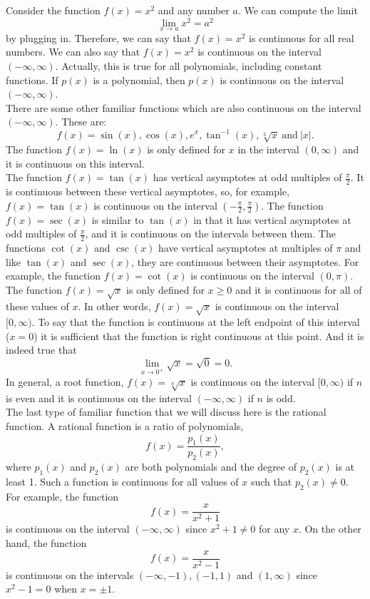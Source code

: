 \documentclass{ximera}
\begin{document}
Consider the function $f(x) = x^2$ and any number $a$. We can compute the limit 
\[\lim_{x \to a} x^2 = a^2\]
by plugging in. Therefore, we can say that $f(x) = x^2$ is continuous for all real numbers.
We can also say that $f(x) = x^2$ is continuous on the interval $(-\infty, \infty)$.
Actually, this is true for all polynomials, including constant functions.
If $p(x)$ is a polynomial, then $p(x)$ is continuous on the interval $(-\infty, \infty)$.\\
There are some other familiar functions which are also continuous on the interval $(-\infty, \infty)$.
These are: 
\[f(x) = \sin(x), \cos(x), e^x, \tan^{-1}(x), \sqrt[3] x \ \text{and} \ |x|.\]
The function $f(x) = \ln(x)$ is only defined for $x$ in the interval $(0, \infty)$ and it is 
continuous on this interval.\\
The function $f(x) = \tan(x)$ has vertical asymptotes at odd multiples of $\frac{\pi}{2}$. 
It is continuous between these vertical asymptotes, so, for example, $f(x) = \tan(x)$ is continuous on the 
interval $(-\frac{\pi}{2},\frac{\pi}{2})$.
The function $f(x) = \sec(x)$ is similar to $\tan(x)$ in that it has vertical asymptotes at odd 
multiples of $\frac{\pi}{2}$, and it is continuous on the intervals between them.
The functions $\cot(x)$ and $\csc(x)$ have vertical asymptotes at multiples of $\pi$ and like 
$\tan(x)$ and $\sec(x)$, they are continuous between their asymptotes. For example, the function
$f(x) = \cot(x)$ is continuous on the interval $(0, \pi)$.\\



The function $f(x) = \sqrt x$ is only defined for $x \geq 0$ and it is continuous for all of these values of $x$.
In other words, $f(x) = \sqrt x$ is continuous on the interval $[0, \infty)$. 
To say that the function is continuous at the left endpoint of this interval ($x = 0$) it is sufficient 
that the function is right continuous at this point. And it is indeed true that
\[\lim_{x \to 0^+} \sqrt x = \sqrt 0 = 0.\]
In general, a root function, $f(x) = \sqrt[n] x$ is continuous on the interval $[0, \infty)$ if $n$ is even and 
it is continuous on the interval $(-\infty, \infty)$ if $n$ is odd.\\

The last type of familiar function that we will discuss here is the rational function.  
A rational function is a ratio of polynomials, 
\[f(x) = \frac{p_1(x)}{p_2(x)}, \]
where $p_1(x)$ and $p_2(x)$ are both polynomials and the degree of $p_2(x)$ is at least 1.
Such a function is continuous for all values of $x$ such that $p_2(x) \neq 0$.
For example, the function
\[f(x) = \frac{x}{x^2 + 1}\]
is continuous on the interval $(-\infty, \infty)$ since $x^2 + 1 \neq 0$ for any $x$.
On the other hand, the function
\[f(x) = \frac{x}{x^2 - 1}\]
is continuous on the intervals $(-\infty, -1), (-1, 1)$ and $(1, \infty)$ since $ x^2 - 1 = 0$
when $x = \pm 1$.
\end{document}
